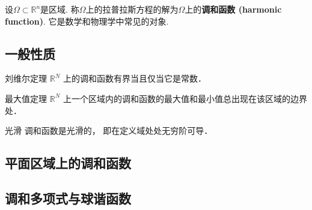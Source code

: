 
\begin{issues}
\issueDraft
\end{issues}


设$\Omega\subset\mathbb{R}^n$是区域. 称$\Omega$上的拉普拉斯方程的解为$\Omega$上的\textbf{调和函数 (harmonic function)}. 它是数学和物理学中常见的对象.


\subsection{一般性质}
\begin{theorem}{刘维尔定理}\label{HarFun_the1}
$\mathbb R^N$ 上的调和函数有界当且仅当它是常数．
\end{theorem}

\begin{theorem}{最大值定理}
$\mathbb R^N$ 上一个区域内的调和函数的最大值和最小值总出现在该区域的边界处．
\end{theorem}

\begin{theorem}{光滑}
调和函数是光滑的， 即在定义域处处无穷阶可导．
\end{theorem}



\subsection{平面区域上的调和函数}


\subsection{调和多项式与球谐函数}
